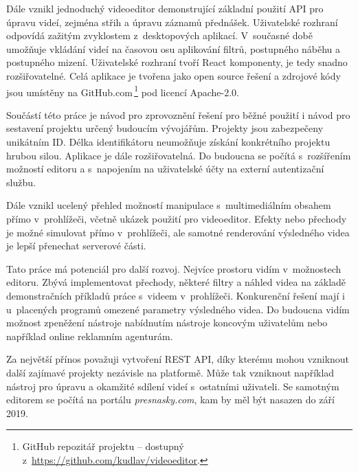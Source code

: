 Dále vznikl jednoduchý videoeditor demonstrující základní použití API pro úpravu videí, zejména střih a úpravu záznamů přednášek. Uživatelské rozhraní odpovídá zažitým zvyklostem z~desktopových aplikací. V~současné době umožňuje vkládání videí na časovou osu aplikování filtrů, postupného náběhu a postupného mizení. Uživatelské rozhraní tvoří React komponenty, je tedy snadno rozšiřovatelné. Celá aplikace je tvořena jako open source řešení a zdrojové kódy jsou umístěny na GitHub.com\,\footnote{GitHub repozitář projektu -- dostupný z~\url{https://github.com/kudlav/videoeditor}.} pod licencí Apache-2.0.

Součástí této práce je návod pro zprovoznění řešení pro běžné použití i návod pro sestavení projektu určený budoucím vývojářům. Projekty jsou zabezpečeny unikátním ID. Délka identifikátoru neumožňuje získání konkrétního projektu hrubou silou. Aplikace je dále rozšiřovatelná. Do budoucna se počítá s~rozšířením možností editoru a s~napojením na uživatelské účty na externí autentizační službu.

Dále vznikl ucelený přehled možností manipulace s~multimediálním obsahem přímo v~prohlížeči, včetně ukázek použití pro videoeditor. Efekty nebo přechody je možné simulovat přímo v~prohlížeči, ale samotné renderování výsledného videa je lepší přenechat serverové části.

Tato práce má potenciál pro další rozvoj. Nejvíce prostoru vidím v~možnostech editoru. Zbývá implementovat přechody, některé filtry a náhled videa na základě demonstračních příkladů práce s~videem v~prohlížeči. Konkurenční řešení mají i u~placených programů omezené parametry výsledného videa. Do budoucna vidím možnost zpeněžení nástroje nabídnutím nástroje koncovým uživatelům nebo například online reklamním agenturám.

Za největší přínos považuji vytvoření REST API, díky kterému mohou vzniknout další zajímavé projekty nezávisle na platformě. Může tak vzniknout například nástroj pro úpravu a okamžité sdílení videí s~ostatními uživateli. Se samotným editorem se počítá na portálu \textit{presnasky.com}, kam by měl být nasazen do září 2019.
